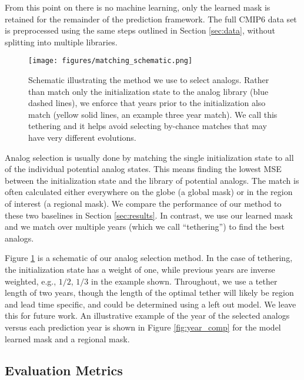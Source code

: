 From this point on there is no machine learning, only the learned mask is retained for the remainder of the prediction framework.
The full CMIP6 data set is preprocessed using the same steps outlined in Section \ref{sec:data}, without splitting into multiple libraries.

\begin{figure}[h!]
    \noindent\texttt{[image: figures/matching\_schematic.png]}
    \caption{Schematic illustrating the method we use to select analogs.
    Rather than match only the initialization state to the analog library (blue dashed lines), we enforce that years prior to the initialization also match (yellow solid lines, an example three year match).
    We call this tethering and it helps avoid selecting by-chance matches that may have very different evolutions.}
    \label{fig:matching}
\end{figure}

Analog selection is usually done by matching the single initialization state to all of the individual potential analog states.
This means finding the lowest MSE between the initialization state and the library of potential analogs.
The match is often calculated either everywhere on the globe (a global mask) or in the region of interest (a regional mask).
We compare the performance of our method to these two baselines in Section \ref{sec:results}.
In contrast, we use our learned mask and we match over multiple years (which we call ``tethering'') to find the best analogs.

Figure \ref{fig:matching} is a schematic of our analog selection method.
In the case of tethering, the initialization state has a weight of one, while previous years are inverse weighted, e.g., $1/2$, $1/3$ in the example shown.
Throughout, we use a tether length of two years, though the length of the optimal tether will likely be region and lead time specific, and could be determined using a left out model.
We leave this for future work.
An illustrative example of the year of the selected analogs versus each prediction year is shown in Figure \ref{fig:year_comp} for the model learned mask and a regional mask.


\subsection{Evaluation Metrics}\label{sec:metrics}

